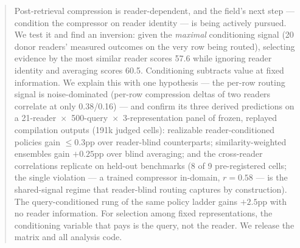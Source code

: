 \begin{abstract}
Post-retrieval compression is reader-dependent, and the field's next step ---
condition the compressor on reader identity --- is being actively pursued. We
test it and find an inversion: given the \emph{maximal} conditioning signal (20
donor readers' measured outcomes on the very row being routed), selecting
evidence by the most similar reader scores 57.6 while ignoring reader identity
and averaging scores 60.5. Conditioning subtracts value at fixed information.
We explain this with one hypothesis --- the per-row routing signal is
noise-dominated (per-row compression deltas of two readers correlate at only
0.38/0.16) --- and confirm its three derived predictions on a
21-reader~$\times$~500-query~$\times$~3-representation panel of frozen, replayed
compilation outputs (191k judged cells): realizable reader-conditioned policies
gain $\le0.3$pp over reader-blind counterparts; similarity-weighted ensembles
gain $+0.25$pp over blind averaging; and the cross-reader correlations
replicate on held-out benchmarks (8 of 9 pre-registered cells; the single
violation --- a trained compressor in-domain, $r = 0.58$ --- is the
shared-signal regime that reader-blind routing captures by construction). The
query-conditioned rung of the same policy ladder gains $+2.5$pp with no reader
information. For selection among fixed representations, the conditioning
variable that pays is the query, not the reader. We release the matrix and all
analysis code.
\end{abstract}

